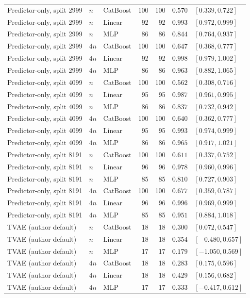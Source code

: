 \begin{longtable}{@{}p{1.6in}llrrrl@{}}
Predictor-only, split 2999 & $n$ & CatBoost & 100 & 100 & $0.570$ & $[0.339, 0.722]$ \\
Predictor-only, split 2999 & $n$ & Linear & 92 & 92 & $0.993$ & $[0.972, 0.999]$ \\
Predictor-only, split 2999 & $n$ & MLP & 86 & 86 & $0.844$ & $[0.764, 0.937]$ \\
Predictor-only, split 2999 & $4n$ & CatBoost & 100 & 100 & $0.647$ & $[0.368, 0.777]$ \\
Predictor-only, split 2999 & $4n$ & Linear & 92 & 92 & $0.998$ & $[0.979, 1.002]$ \\
Predictor-only, split 2999 & $4n$ & MLP & 86 & 86 & $0.963$ & $[0.882, 1.065]$ \\
Predictor-only, split 4099 & $n$ & CatBoost & 100 & 100 & $0.562$ & $[0.308, 0.716]$ \\
Predictor-only, split 4099 & $n$ & Linear & 95 & 95 & $0.987$ & $[0.961, 0.995]$ \\
Predictor-only, split 4099 & $n$ & MLP & 86 & 86 & $0.837$ & $[0.732, 0.942]$ \\
Predictor-only, split 4099 & $4n$ & CatBoost & 100 & 100 & $0.640$ & $[0.362, 0.777]$ \\
Predictor-only, split 4099 & $4n$ & Linear & 95 & 95 & $0.993$ & $[0.974, 0.999]$ \\
Predictor-only, split 4099 & $4n$ & MLP & 86 & 86 & $0.965$ & $[0.917, 1.021]$ \\
Predictor-only, split 8191 & $n$ & CatBoost & 100 & 100 & $0.611$ & $[0.337, 0.752]$ \\
Predictor-only, split 8191 & $n$ & Linear & 96 & 96 & $0.978$ & $[0.960, 0.996]$ \\
Predictor-only, split 8191 & $n$ & MLP & 85 & 85 & $0.810$ & $[0.727, 0.903]$ \\
Predictor-only, split 8191 & $4n$ & CatBoost & 100 & 100 & $0.677$ & $[0.359, 0.787]$ \\
Predictor-only, split 8191 & $4n$ & Linear & 96 & 96 & $0.996$ & $[0.969, 0.999]$ \\
Predictor-only, split 8191 & $4n$ & MLP & 85 & 85 & $0.951$ & $[0.884, 1.018]$ \\
TVAE (author default) & $n$ & CatBoost & 18 & 18 & $0.300$ & $[0.072, 0.547]$ \\
TVAE (author default) & $n$ & Linear & 18 & 18 & $0.354$ & $[-0.480, 0.657]$ \\
TVAE (author default) & $n$ & MLP & 17 & 17 & $0.179$ & $[-1.050, 0.569]$ \\
TVAE (author default) & $4n$ & CatBoost & 18 & 18 & $0.283$ & $[0.175, 0.596]$ \\
TVAE (author default) & $4n$ & Linear & 18 & 18 & $0.429$ & $[0.156, 0.682]$ \\
TVAE (author default) & $4n$ & MLP & 17 & 17 & $0.333$ & $[-0.417, 0.612]$ \\
\bottomrule
\end{longtable}
